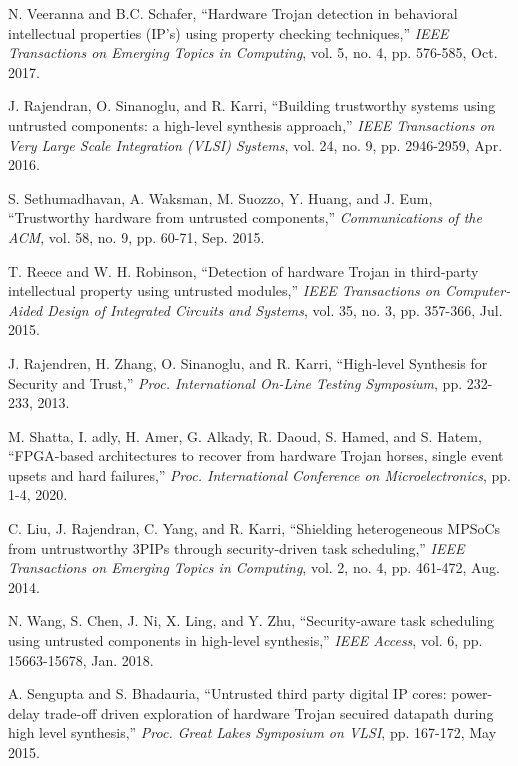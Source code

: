 \documentclass[10pt,journal]{IEEEtran}
\begin{document}
\begin{thebibliography}{99}
N. Veeranna and B.C. Schafer, ``Hardware Trojan detection in behavioral intellectual properties (IP's) using property checking techniques,'' \textit{IEEE Transactions on Emerging Topics in Computing}, vol. 5, no. 4, pp. 576-585, Oct. 2017.

J. Rajendran, O. Sinanoglu, and R. Karri, ``Building trustworthy systems using untrusted components: a high-level synthesis approach,'' \textit{IEEE Transactions on Very Large Scale Integration (VLSI) Systems}, vol. 24, no. 9, pp. 2946-2959, Apr. 2016.

S. Sethumadhavan, A. Waksman, M. Suozzo, Y. Huang, and J. Eum, ``Trustworthy hardware from untrusted components,'' \textit{Communications of the ACM}, vol. 58, no. 9, pp. 60-71, Sep. 2015.

T. Reece and W. H. Robinson, ``Detection of hardware Trojan in third-party intellectual property using untrusted modules,'' \textit{IEEE Transactions on Computer-Aided Design of Integrated Circuits and Systems}, vol. 35, no. 3, pp. 357-366, Jul. 2015.

J. Rajendren, H. Zhang, O. Sinanoglu, and R. Karri, ``High-level Synthesis for Security and Trust,'' \textit{Proc. International On-Line Testing Symposium}, pp. 232-233, 2013.

M. Shatta, I. adly, H. Amer, G. Alkady, R. Daoud, S. Hamed, and S. Hatem, ``FPGA-based architectures to recover from hardware Trojan horses, single event upsets and hard failures,'' \textit{Proc. International Conference on Microelectronics}, pp. 1-4, 2020.

C. Liu, J. Rajendran, C. Yang, and R. Karri, ``Shielding heterogeneous MPSoCs from untrustworthy 3PIPs through security-driven task scheduling,'' \textit{IEEE Transactions on Emerging Topics in Computing}, vol. 2, no. 4, pp. 461-472, Aug. 2014.

N. Wang, S. Chen, J. Ni, X. Ling, and Y. Zhu, ``Security-aware task scheduling using untrusted components in high-level synthesis,'' \textit{IEEE Access}, vol. 6, pp. 15663-15678, Jan. 2018.

A. Sengupta and S. Bhadauria, ``Untrusted third party digital IP cores: power-delay trade-off driven exploration of hardware Trojan secuired datapath during high level synthesis,'' \textit{Proc. Great Lakes Symposium on VLSI}, pp. 167-172, May 2015.


\end{thebibliography}
\end{document}
